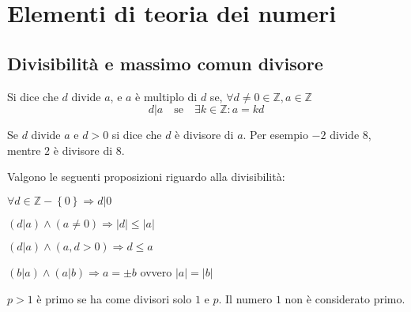 \section{Elementi di teoria dei numeri}

\subsection{Divisibilità e massimo comun divisore}

\begin{definition}[Divisibilità]
    \label{def:divisibilita}
    Si dice che $d$ divide $a$, e $a$ è multiplo di $d$ se,
    $
    \forall d \ne 0 \in \mathbb{Z}
    ,
    a \in \mathbb{Z}
    $
    \begin{equation*}
        d | a 
        \quad
        \text{se}
        \quad
        \exists k \in \mathbb{Z} : a = kd
    \end{equation*}
\end{definition}
\begin{definition}[Divisore]
    \label{def:divisore}
    Se $d$ divide $a$ e $d>0$ si dice che $d$ è divisore di $a$.
    Per esempio $-2$ divide $8$, mentre $2$ è divisore di $8$.
\end{definition}
Valgono le seguenti proposizioni riguardo alla divisibilità:
\begin{proposizione}
    $\forall d \in \mathbb{Z} - \left\{ 0 \right\}
    \Rightarrow
    d | 0$
\end{proposizione}
\begin{proposizione}
    $
    \left( d | a \right)
    \wedge
    \left( a \ne 0 \right)
    \Rightarrow
    |d| \leq |a|
    $
\end{proposizione}
\begin{corollario}
    \label{cor:divisore_limite}
    $
    \left( d | a \right)
    \wedge
    \left( a,d > 0 \right)
    \Rightarrow
    d \leq a
    $
\end{corollario}
\begin{proposizione}
    $
    \left( b | a \right)
    \wedge
    \left( a | b \right)
    \Rightarrow
    a = \pm b
    $ ovvero $
    |a| = |b|
    $
\end{proposizione}
\begin{definition}
    \label{def:numeroprimo}
    $p > 1$ è primo se ha come divisori solo $1$ e $p$. Il numero $1$ non è considerato primo.
\end{definition}
